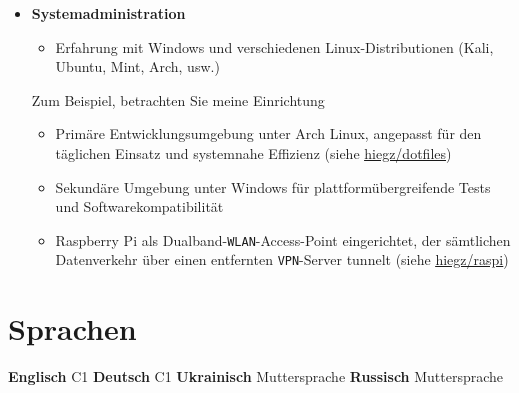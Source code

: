 \documentclass[]{article}
\begin{document}
\begin{minipage}[t]{0.49\linewidth}
    \begin{itemize}[leftmargin=0.15in, rightmargin=0.15in, label={}]
        \item {\large\bfseries Systemadministration}

            \begin{itemize}
                \item Erfahrung mit Windows und verschiedenen Linux-Distributionen (Kali, Ubuntu, Mint, Arch, usw.)
            \end{itemize}

            \hspace{5pt}
            Zum Beispiel, betrachten Sie meine Einrichtung

            \begin{itemize}
                \item Primäre Entwicklungsumgebung unter Arch Linux, angepasst für den täglichen Einsatz und systemnahe Effizienz
                    (siehe \href{https://github.com/hiegz/dotfiles}{\ttfamily \underline{hiegz/dotfiles}})
                \item Sekundäre Umgebung unter Windows für plattformübergreifende Tests und Softwarekompatibilität
                \item Raspberry Pi als Dualband-\verb|WLAN|-Access-Point eingerichtet,
                    der sämtlichen Datenverkehr über einen entfernten \verb|VPN|-Server tunnelt
                    (siehe \href{https://github.com/hiegz/raspi}{\ttfamily \underline{hiegz/raspi}})
            \end{itemize}
    \end{itemize}
\end{minipage}

\vspace{5pt}
\section{Sprachen}

\hspace{0.15in}
\textbf{Englisch} \: C1 \hspace{20pt} \textbf{Deutsch} \: C1 \hspace{20pt} \textbf{Ukrainisch} \: Muttersprache \hspace{20pt} \textbf{Russisch} \: Muttersprache
\end{document}
